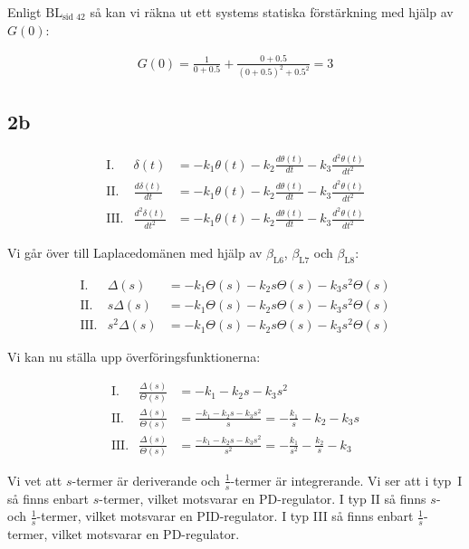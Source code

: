\documentclass[a4paper]{article}
\newcommand{\mhb}[1]{$\beta_{\text{#1}}$}     %
\newcommand{\bl}[1]{$\text{BL}_{\text{#1}}$}  %
\begin{document}
Enligt \bl{sid 42} så kan vi räkna ut ett systems statiska förstärkning med hjälp av $G(0)$:

\begin{align*}
  G(0) = \frac{1}{0+0.5} + \frac{0+0.5}{(0+0.5)^2 + 0.5^2} = 3
\end{align*}

%
%


\subsection{2b}
\begin{eqnarray*}
  \text{I.}   & \delta(t)                 &= -k_1 \theta(t) - k_2\frac{d\theta(t)}{dt} - k_3\frac{d^2\theta(t)}{dt^2}\\
  \text{II.}  & \frac{d\delta(t)}{dt}     &= -k_1 \theta(t) - k_2\frac{d\theta(t)}{dt} - k_3\frac{d^2\theta(t)}{dt^2}\\
  \text{III.} & \frac{d^2\delta(t)}{dt^2} &= -k_1 \theta(t) - k_2\frac{d\theta(t)}{dt} - k_3\frac{d^2\theta(t)}{dt^2}
\end{eqnarray*}

Vi går över till Laplacedomänen med hjälp av \mhb{L6}, \mhb{L7} och \mhb{L8}:

\begin{eqnarray*}
  \text{I.}   & \Delta(s)    &= -k_1 \Theta(s) - k_2 s\Theta(s) - k_3 s^2\Theta(s)\\
  \text{II.}  & s\Delta(s)   &= -k_1 \Theta(s) - k_2 s\Theta(s) - k_3 s^2\Theta(s)\\
  \text{III.} & s^2\Delta(s) &= -k_1 \Theta(s) - k_2 s\Theta(s) - k_3 s^2\Theta(s)
\end{eqnarray*}

Vi kan nu ställa upp överföringsfunktionerna:

\begin{eqnarray*}
  \text{I.}   & \frac{\Delta(s)}{\Theta(s)} &= -k_1 - k_2 s - k_3 s^2\\
  \text{II.}  & \frac{\Delta(s)}{\Theta(s)} &= \frac{-k_1 - k_2 s - k_3 s^2}{s} = -\frac{k_1}{s} - k_2 - k_3s\\
  \text{III.} & \frac{\Delta(s)}{\Theta(s)} &= \frac{-k_1 - k_2 s - k_3 s^2}{s^2} = -\frac{k_1}{s^2} - \frac{k_2}{s} - k_3
\end{eqnarray*}

Vi vet att $s$-termer är deriverande och $\frac{1}{s}$-termer är integrerande. Vi ser att i \mbox{typ I} så finns enbart $s$-termer, vilket motsvarar en PD-regulator. I typ II så finns $s$- och $\frac{1}{s}$-termer, vilket motsvarar en PID-regulator. I typ III så finns enbart $\frac{1}{s}$-termer, vilket motsvarar en PD-regulator.
\end{document}
